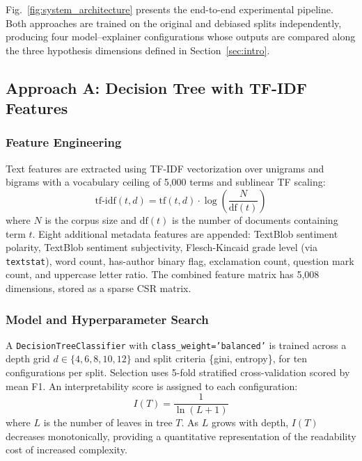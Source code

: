 \documentclass[journal,10pt,twocolumn]{IEEEtran}
\begin{document}
Fig.~\ref{fig:system_architecture} presents the end-to-end experimental
pipeline.  Both approaches are trained on the original and debiased
splits independently, producing four model--explainer configurations
whose outputs are compared along the three hypothesis dimensions
defined in Section~\ref{sec:intro}.

\subsection{Approach A: Decision Tree with TF-IDF Features}
\label{sec:approach_a}

\subsubsection{Feature Engineering}
Text features are extracted using TF-IDF vectorization over unigrams
and bigrams with a vocabulary ceiling of 5{,}000 terms and sublinear TF
scaling:
\begin{equation}
  \mathrm{tf\text{-}idf}(t,d)
    = \mathrm{tf}(t,d) \cdot \log\!\left(\frac{N}{\mathrm{df}(t)}\right)
  \label{eq:tfidf}
\end{equation}
where $N$ is the corpus size and $\mathrm{df}(t)$ is the number of
documents containing term $t$.  Eight additional metadata features are
appended: TextBlob sentiment polarity, TextBlob sentiment subjectivity,
Flesch-Kincaid grade level (via \texttt{textstat}), word count,
has-author binary flag, exclamation count, question mark count, and
uppercase letter ratio.  The combined feature matrix has 5{,}008
dimensions, stored as a sparse CSR matrix.

\subsubsection{Model and Hyperparameter Search}
A \texttt{DecisionTreeClassifier} with \texttt{class\_weight='balanced'}
is trained across a depth grid $d \in \{4, 6, 8, 10, 12\}$ and split
criteria \{gini, entropy\}, for ten configurations per split.
Selection uses 5-fold stratified cross-validation scored by mean F1.
An interpretability score is assigned to each configuration:
\begin{equation}
  I(T) = \frac{1}{\ln(L + 1)}
  \label{eq:interp}
\end{equation}
where $L$ is the number of leaves in tree $T$.  As $L$ grows with
depth, $I(T)$ decreases monotonically, providing a quantitative
representation of the readability cost of increased complexity.
\end{document}
